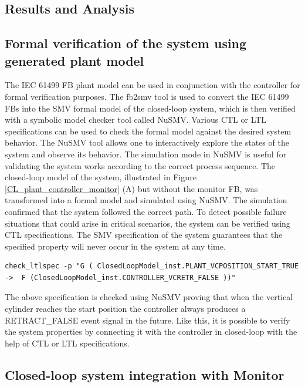 \begin{bibunit}
\section{Results and Analysis}

\subsection{Formal verification of the system using generated plant model}

The IEC 61499 FB plant model can be used in conjunction with the controller for formal verification purposes. The fb2smv tool is used to convert the IEC 61499 FBs into the SMV formal model of the closed-loop system, which is then verified with a symbolic model checker tool called NuSMV. Various CTL or LTL specifications can be used to check the formal model against the desired system behavior. The NuSMV tool allows one to interactively explore the states of the system and observe its behavior. The simulation mode in NuSMV is useful for validating the system works according to the correct process sequence. The closed-loop model of the system, illustrated in Figure \ref{CL_plant_controller_monitor}  (A) but without the monitor FB, was transformed into a formal model and simulated using NuSMV. The simulation confirmed that the system followed the correct path. To detect possible failure situations that could arise in critical scenarios, the system can be verified using CTL specifications. The SMV specification of the system guarantees that the specified property will never occur in the system at any time.

\begin{lstlisting}[breaklines,basicstyle=\small]
check_ltlspec -p "G ( ClosedLoopModel_inst.PLANT_VCPOSITION_START_TRUE  ->  F (ClosedLoopModel_inst.CONTROLLER_VCRETR_FALSE ))"
\end{lstlisting}

The above specification is checked using NuSMV proving that when  the vertical cylinder reaches the start position the controller always produces a RETRACT\_FALSE event signal in the future. Like this, it is possible to  verify the system properties by connecting it with the controller in closed-loop  with the help of CTL or LTL specifications.


\subsection{Closed-loop system integration with Monitor}


\end{bibunit}
